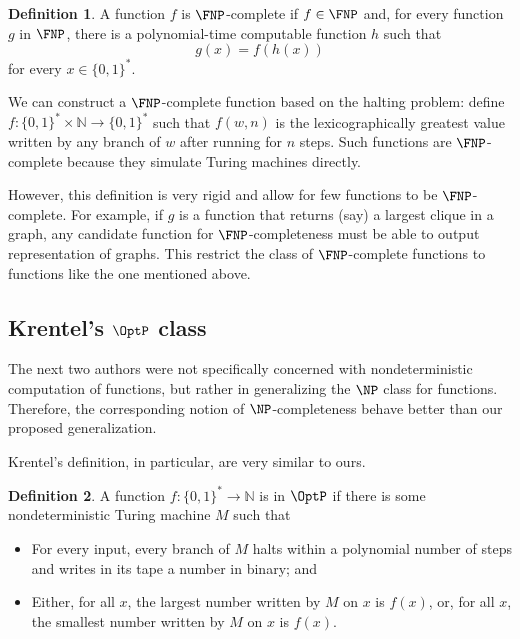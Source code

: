 \documentclass[12pt]{article}
\theoremstyle{definition}
\newtheorem{definition}{Definition}
\begin{document}
\begin{definition}
    A function $f$ is $\FNP$-complete if $f \in \FNP$ and,
    for every function $g$ in $\FNP$,
    there is a polynomial-time computable function $h$ such that
    \begin{equation*}
        g(x) = f(h(x))
    \end{equation*}
    for every $x \in \{0, 1\}^*$.
\end{definition}

We can construct a $\FNP$-complete function based on the halting problem:
define $f : \{0, 1\}^* \times \mathbb N \to \{0, 1\}^*$
such that $f(w, n)$ is the lexicographically greatest value written by any branch of $w$
after running for $n$ steps.
Such functions are $\FNP$-complete
because they simulate Turing machines directly.

However, this definition is very rigid
and allow for few functions to be $\FNP$-complete.
For example, if $g$ is a function that returns
(say) a largest clique in a graph,
any candidate function for $\FNP$-completeness
must be able to output representation of graphs.
This restrict the class of $\FNP$-complete functions
to functions like the one mentioned above.

\subsection{Krentel's $\OptP$ class}

The next two authors were not specifically concerned
with nondeterministic computation of functions,
but rather in generalizing the $\NP$ class for functions.
Therefore, the corresponding notion of $\NP$-completeness
behave better than our proposed generalization.

Krentel's definition, in particular,
are very similar to ours.

\begin{definition}
    A function $f: \{0, 1\}^* \to \mathbb N$ is in $\OptP$
    if there is some nondeterministic Turing machine $M$ such that
    \cite[p.~493]{Krentel1988}
    \begin{itemize}
        \item For every input,
            every branch of $M$ halts within a polynomial number of steps
            and writes in its tape a number in binary; and
        \item Either,
            for all $x$, the largest number written by $M$ on $x$ is $f(x)$,
            or, for all $x$, the smallest number written by $M$ on $x$ is $f(x)$.
    \end{itemize}
\end{definition}
\end{document}
